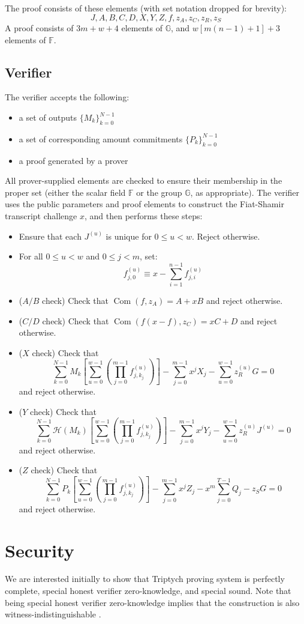 \documentclass[draft]{article}
\newcommand{\G}{\mathbb{G}}
\newcommand{\F}{\mathbb{F}}
\newcommand{\hp}{\mathcal{H}}
\newcommand{\com}{\operatorname{Com}}
\newcommand{\sumj}{\sum_{j=0}^{m-1}}
\newcommand{\sumk}{\sum_{k=0}^{N-1}}
\newcommand{\sumu}{\sum_{u=0}^{w-1}}
\begin{document}
The proof consists of these elements (with set notation dropped for brevity):
$$J,A,B,C,D,X,Y,Z,f,z_A,z_C,z_R,z_S$$
A proof consists of $3m + w + 4$ elements of $\G$, and $w\left[ m(n-1) + 1 \right] + 3$ elements of $\F$.


\subsection{Verifier}
The verifier accepts the following:
\begin{itemize}
\item a set of outputs $\{M_k\}_{k=0}^{N-1}$
\item a set of corresponding amount commitments $\{P_k\}_{k=0}^{N-1}$
\item a proof generated by a prover
\end{itemize}

All prover-supplied elements are checked to ensure their membership in the proper set (either the scalar field $\F$ or the group $\G$, as appropriate).
The verifier uses the public parameters and proof elements to construct the Fiat-Shamir transcript challenge $x$, and then performs these steps:
\begin{itemize}
\item Ensure that each $J^{(u)}$ is unique for $0 \leq u < w$.
Reject otherwise.
\item For all $0 \leq u < w$ and $0 \leq j < m$, set: $$f^{(u)}_{j,0} \equiv x - \sum_{i=1}^{n-1} f^{(u)}_{j,i}$$
\item{($A/B$ check)} Check that $\com(f,z_A) = A + xB$ and reject otherwise.
\item{($C/D$ check)} Check that $\com(f(x-f),z_C) = xC + D$ and reject otherwise.
\item{($X$ check)} Check that $$\sumk M_k \left[ \sumu \left( \prod_{j=0}^{m-1} f^{(u)}_{j,k_j} \right) \right] - \sumj x^jX_j - \sumu z^{(u)}_RG = 0$$ and reject otherwise.
\item{($Y$ check)} Check that $$\sumk \hp(M_k) \left[ \sumu \left( \prod_{j=0}^{m-1} f^{(u)}_{j,k_j} \right) \right] - \sumj x^jY_j - \sumu z^{(u)}_RJ^{(u)} = 0$$ and reject otherwise.
\item{($Z$ check)} Check that $$\sumk P_k \left[ \sumu \left( \prod_{j=0}^{m-1} f^{(u)}_{j,k_j} \right) \right] - \sumj x^jZ_j - x^m\sum_{j=0}^{T-1} Q_j - z_SG = 0$$ and reject otherwise.
\end{itemize}


\section{Security}
We are interested initially to show that Triptych proving system is perfectly complete, special honest verifier zero-knowledge, and special sound. Note that being special honest verifier zero-knowledge implies that the construction is also witness-indistinguishable \cite{cramer}.
\end{document}
